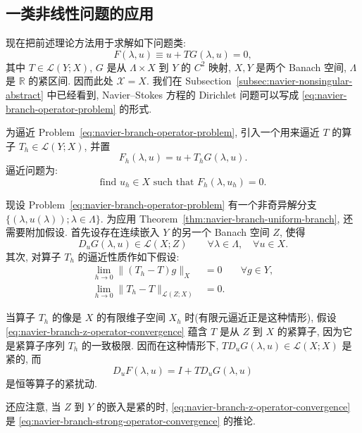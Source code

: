 \subsection{一类非线性问题的应用}
\label{subsec:navier-branch-nonlinear-application}

现在把前述理论方法用于求解如下问题类:
\begin{equation}\label{eq:navier-branch-operator-problem}
F(\lambda,u)\equiv u+TG(\lambda,u)=0,
\end{equation}
其中 $T\in\mathcal L(Y;X)$, $G$ 是从 $\Lambda\times X$ 到 $Y$ 的 $C^2$ 映射,
$X,Y$ 是两个 Banach 空间, $\Lambda$ 是 $\mathbb R$ 的紧区间. 因而此处
$\mathscr X=X$. 我们在 Subsection~\ref{subsec:navier-nonsingular-abstract}
中已经看到, Navier--Stokes 方程的 Dirichlet 问题可以写成
\eqref{eq:navier-branch-operator-problem} 的形式.

为逼近 Problem~\eqref{eq:navier-branch-operator-problem}, 引入一个用来逼近
$T$ 的算子 $T_h\in\mathcal L(Y;X)$, 并置
\begin{equation}\label{eq:navier-branch-operator-approximation}
F_h(\lambda,u)=u+T_hG(\lambda,u).
\end{equation}
逼近问题为:
\begin{equation}\label{eq:navier-branch-operator-discrete-problem}
\text{find }u_h\in X\text{ such that }F_h(\lambda,u_h)=0.
\end{equation}

现设 Problem~\eqref{eq:navier-branch-operator-problem} 有一个非奇异解分支
$\{(\lambda,u(\lambda));\lambda\in\Lambda\}$. 为应用
Theorem~\ref{thm:navier-branch-uniform-branch}, 还需要附加假设. 首先设存在连续嵌入
$Y$ 的另一个 Banach 空间 $Z$, 使得
\begin{equation}\label{eq:navier-branch-derivative-into-z}
D_uG(\lambda,u)\in\mathcal L(X;Z)
\qquad\forall\lambda\in\Lambda,\quad\forall u\in X.
\end{equation}
其次, 对算子 $T_h$ 的逼近性质作如下假设:
\begin{align}
\lim_{h\to0}\|(T_h-T)g\|_X&=0
&&\forall g\in Y,
\label{eq:navier-branch-strong-operator-convergence}\\
\lim_{h\to0}\|T_h-T\|_{\mathcal L(Z;X)}&=0.
\label{eq:navier-branch-z-operator-convergence}
\end{align}

\setcounter{statement}{3}
\begin{Remark}\label{rem:navier-branch-compact-operator-approximation}
当算子 $T_h$ 的像是 $X$ 的有限维子空间 $X_h$ 时(有限元逼近正是这种情形),
假设 \eqref{eq:navier-branch-z-operator-convergence} 蕴含 $T$ 是从 $Z$ 到 $X$
的紧算子, 因为它是紧算子序列 $T_h$ 的一致极限. 因而在这种情形下,
$TD_uG(\lambda,u)\in\mathcal L(X;X)$ 是紧的, 而
\[
D_uF(\lambda,u)=I+TD_uG(\lambda,u)
\]
是恒等算子的紧扰动.

还应注意, 当 $Z$ 到 $Y$ 的嵌入是紧的时,
\eqref{eq:navier-branch-z-operator-convergence} 是
\eqref{eq:navier-branch-strong-operator-convergence} 的推论.
\end{Remark}

